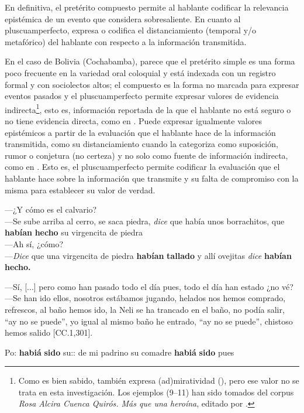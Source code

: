 \documentclass[output=paper]{../langscibook}
\begin{document}
En definitiva, el pretérito compuesto permite al hablante codificar la relevancia epistémica de un evento que considera sobresaliente. En cuanto al pluscuamperfecto, expresa o codifica el distanciamiento (temporal y/o metafórico) del hablante con respecto a la información transmitida. 

En el caso de Bolivia (Cochabamba), parece que el pretérito simple es una forma poco frecuente en la variedad oral coloquial y está indexada con un registro formal y con sociolectos altos; el compuesto es la forma no marcada para expresar eventos pasados y el pluscuamperfecto permite expresar valores de evidencia indirecta\footnote{Como es bien sabido, también expresa (ad)miratividad (\citealt{PalaciosAlcainePfänder2018}), pero ese valor no se trata en esta investigación. Los ejemplos (9--11) han sido tomados del corpus \textit{Rosa Alcira Cuenca Quirós. Más que una heroína}, editado por  \citet{CoelloVilaPfänder2012}.}, esto es, información reportada de la que el hablante no está seguro o no tiene evidencia directa, como en . Puede expresar igualmente valores epistémicos a partir de la evaluación que el hablante hace de la información transmitida, como su distanciamiento cuando la categoriza como suposición, rumor o conjetura (no certeza) y no solo como fuente de información indirecta, como en . Esto es, el pluscuamperfecto permite codificar la evaluación que el hablante hace sobre la información que transmite y su falta de compromiso con la misma para establecer su valor de verdad.

\ea\label{ex:palacios:9}

—¿Y cómo es el calvario?\\
—Se sube arriba al cerro, se saca piedra, \textit{dice} que había unos borrachitos, que \textbf{habían} \textbf{hecho} su virgencita de piedra\\
—Ah sí, ¿cómo?\\
—\textit{Dice} que una virgencita de piedra \textbf{habían} \textbf{tallado} y allí ovejitas \textit{dice} \textbf{habían} \textbf{hecho.}


—Sí, [...] pero como han pasado todo el día pues, todo el día han estado ¿no vé?\\
—Se han ido ellos, nosotros estábamos jugando, helados nos hemos comprado, refrescos, al baño hemos ido, la Neli se ha trancado en el baño, no podía salir, “ay no se puede”, yo igual al mismo baño he entrado, “ay no se puede”, chistoso hemos salido [CC.1,301]. 
\z

\ea\label{ex:palacios:10}
Po:  \textbf{habiá} \textbf{sido} su:: de mi padrino su comadre \textbf{habiá} \textbf{sido} pues
\end{document}

